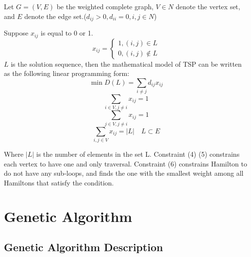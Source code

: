 \documentclass[12pt]{article}
\begin{document}
Let $G=(V,E)$ be the weighted complete graph, $V\in N$ denote the vertex set, and $E$ denote the edge set.($d_{ij}>0,d_{ii}=0,i,j\in N$)

Suppose $x_{ij}$ is equal to 0 or 1.
\begin{equation}
x_{i j}=\left\{\begin{array}{l}{1, (i,j)\in L} \\ {0, (i,j)\notin L}\end{array}\right.
\end{equation}
$L$ is the solution sequence, then the mathematical model of TSP can be written as the following linear programming form:
\begin{equation}
    \min D(L)=\sum_{i \neq j} d_{i j} x_{i j}
\end{equation}
\begin{equation} 
    \sum_{i \in V, j \neq i} x_{i j}=1
\end{equation}
\begin{equation} 
    \sum_{j \in V, j \neq i} x_{i j}=1
\end{equation}
\begin{equation} 
    \sum_{i, j \in V} x_{i j}=|L| \quad L \subset E
\end{equation}

Where $|L|$ is the number of elements in the set L. 
Constraint (4) (5) constrains each vertex to have one and only traversal. 
Constraint (6) constrains Hamilton to do not have any sub-loops, 
and finds the one with the smallest weight among all Hamiltons that satisfy the condition.

\section{Genetic Algorithm}
\subsection{Genetic Algorithm Description}
\end{document}
